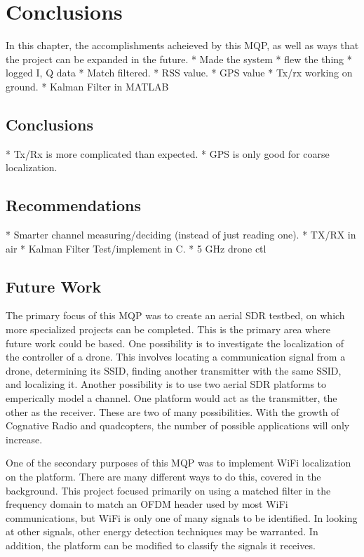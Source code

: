 \chapter{Conclusions}
In this chapter, the accomplishments acheieved by this MQP, as well as ways that 
the project can be expanded in the future. 
 * Made the system
 * flew the thing
 * logged I, Q data
 * Match filtered.
 * RSS value.
 * GPS value
 * Tx/rx working on ground.
 * Kalman Filter in MATLAB

\section{Conclusions} %
 * Tx/Rx is more complicated than expected.
 * GPS is only good for coarse localization.

\section{Recommendations}
 * Smarter channel measuring/deciding (instead of just reading one).
 * TX/RX in air
 * Kalman Filter Test/implement in C.
 * 5 GHz drone ctl


\section{Future Work}
The primary focus of this MQP was to create an aerial SDR testbed, on which more 
specialized projects can be completed. This is the primary area where future work
could be based. One possibility is to investigate the localization of the controller
of a drone. This involves locating a communication signal from a drone, determining its
SSID, finding another transmitter with the same SSID, and localizing it. Another possibility
is to use two aerial SDR platforms to emperically model a channel. One platform
would act as the transmitter, the other as the receiver. These are two of many possibilities.
With the growth of Cognative Radio and quadcopters, the number of possible applications
will only increase.\par

One of the secondary purposes of this MQP was to implement WiFi localization on 
the platform. There are many different ways to do this, covered in the background.
This project focused primarily on using a matched filter in the frequency domain to match
an OFDM header used by most WiFi communications, but WiFi is only one of many 
signals to be identified. In looking at other signals, other energy detection
techniques may be warranted. In addition, the platform can be modified to 
classify the signals it receives.\par

